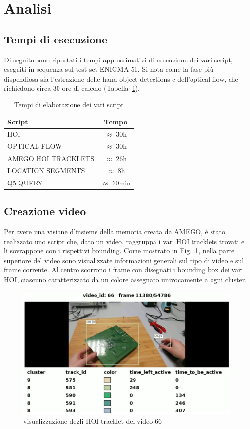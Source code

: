 \section{Analisi}
\subsection*{Tempi di esecuzione}

Di seguito sono riportati i tempi approssimativi di esecuzione dei vari script, eseguiti in sequenza sul test-set ENIGMA-51.
Si nota come la fase più dispendiosa sia l'estrazione delle hand-object detections e dell'optical flow, che richiedono circa 30 ore di calcolo (Tabella~\ref{tab:tempi}).

\begin{table}[ht]
    \centering
    \caption{Tempi di elaborazione dei vari script}
    \begin{tabular}{|l|c|}
        \hline
        \textbf{Script} & \textbf{Tempo} \\
        \hline
        HOI & $\approx$ 30h \\
        OPTICAL FLOW & $\approx$ 30h \\
        AMEGO HOI TRACKLETS & $\approx$ 26h \\
        LOCATION SEGMENTS & $\approx$ 8h \\
        Q5 QUERY & $\approx$ 30min \\
        \hline
    \end{tabular}
    \label{tab:tempi}
\end{table}

\subsection*{Creazione video}

Per avere una visione d'insieme della memoria creata da AMEGO, è stato realizzato uno script che, dato un video, raggruppa i vari HOI tracklets trovati e li sovrappone con i rispettivi bounding.
Come mostrato in Fig.~\ref{fig:amego_video}, nella parte superiore del video sono visualizzate informazioni generali sul tipo di video e sul frame corrente. Al centro scorrono i frame con disegnati i bounding box dei vari HOI, ciascuno caratterizzato da un colore assegnato univocamente a ogni cluster.

\begin{figure}[ht]
    \centering
    \includegraphics[width=0.8\linewidth]{Images/amego_video.jpg}
    \caption{visualizzazione degli HOI tracklet del video 66 }
    \label{fig:amego_video}
\end{figure}

